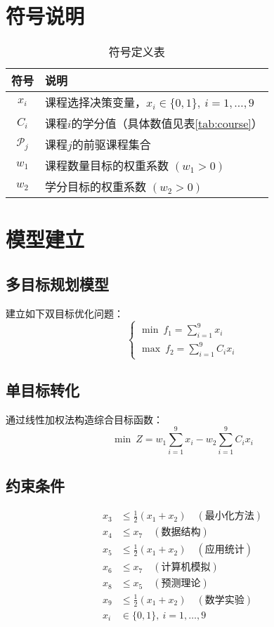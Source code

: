 \section{符号说明}
\begin{table}[!ht]
\centering
\caption{符号定义表}
\label{tab:symbols}
\begin{tabular}{cl}
\toprule
符号 & 说明 \\
\midrule
$x_i$ & 课程选择决策变量，$x_i \in \{0,1\},\ i=1,\dots,9$ \\
$C_i$ & 课程$i$的学分值（具体数值见表\ref{tab:course}） \\
$\mathcal{P}_j$ & 课程$j$的前驱课程集合 \\
$w_1$ & 课程数量目标的权重系数 $(w_1 > 0)$ \\
$w_2$ & 学分目标的权重系数 $(w_2 > 0)$ \\
\bottomrule
\end{tabular}
\end{table}

\section{模型建立}
\subsection{多目标规划模型}
建立如下双目标优化问题：
\begin{equation}
\begin{cases}
\displaystyle \min\ f_1 = \sum_{i=1}^{9} x_i \\
\displaystyle \max\ f_2 = \sum_{i=1}^{9} C_i x_i 
\end{cases}
\end{equation}

\subsection{单目标转化}
通过线性加权法构造综合目标函数：
\begin{equation}
\min\ Z = w_1 \sum_{i=1}^{9} x_i - w_2 \sum_{i=1}^{9} C_i x_i
\end{equation}

\subsection{约束条件}
\begin{align}
x_3 & \leq \frac{1}{2}(x_1 + x_2) \quad (\text{最小化方法}) \\
x_4 & \leq x_7 \quad (\text{数据结构}) \\
x_5 & \leq \frac{1}{2}(x_1 + x_2) \quad (\text{应用统计}) \\
x_6 & \leq x_7 \quad (\text{计算机模拟}) \\
x_8 & \leq x_5 \quad (\text{预测理论}) \\
x_9 & \leq \frac{1}{2}(x_1 + x_2) \quad (\text{数学实验}) \\
x_i & \in \{0,1\},\ i=1,\dots,9
\end{align}


